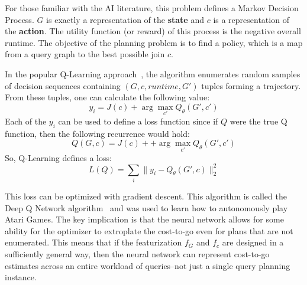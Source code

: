 For those familiar with the AI literature, this problem defines a Markov Decision Process. $G$ is exactly a representation of the \textbf{state} and $c$ is a representation of the \textbf{action}.
The utility function (or reward) of this process is the negative overall runtime.
The objective of the planning problem is to find a policy, which is a map from a query graph to the best possible join $c$.

In the popular Q-Learning approach~\cite{sutton1998reinforcement}, the algorithm enumerates random samples of decision sequences containing $(G,c, runtime, G')$ tuples forming a trajectory. From these tuples, one can calculate the following value:
\[
y_i = J(c) + \arg \max_{c'} Q_\theta(G',c')
\]
Each of the $y_i$ can be used to define a loss function since if $Q$ were the true Q function, then the following recurrence would hold:
\[
Q(G,c) = J(c) + + \arg \max_{c'} Q_\theta(G',c')
\]
So, Q-Learning defines a loss:
\[
L(Q) = \sum_{i} \|y_i - Q_\theta(G',c)\|_2^2
\]

This loss can be optimized with gradient descent. 
This algorithm is called the Deep Q Network algorithm~\cite{mnih2015human} and was used to learn how to autonomously play Atari Games.
The key implication is that the neural network allows for some ability for the optimizer to extroplate the cost-to-go even for plans that are not enumerated. This means that if the featurization $f_G$ and $f_c$ are designed in a sufficiently general way, then the neural network can represent cost-to-go estimates across an entire workload of queries--not just a single query planning instance.
